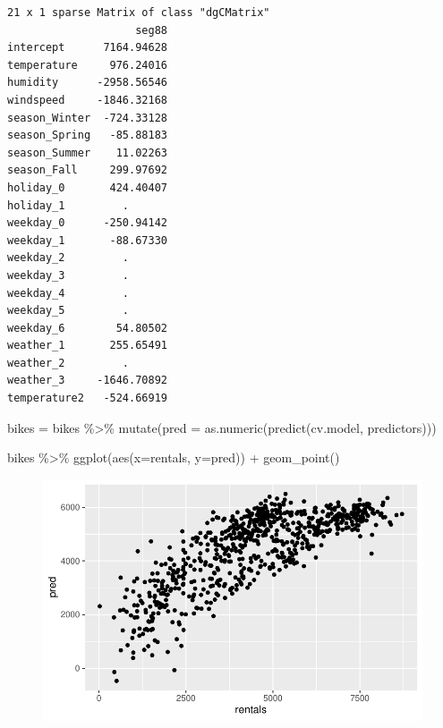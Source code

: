 \documentclass[
  letterpaper,
  DIV=11,
  numbers=noendperiod]{scrartcl}
\newenvironment{Shaded}{\begin{snugshade}}{\end{snugshade}}
\newcommand{\AttributeTok}[1]{\textcolor[rgb]{0.40,0.45,0.13}{#1}}
\newcommand{\FunctionTok}[1]{\textcolor[rgb]{0.28,0.35,0.67}{#1}}
\newcommand{\NormalTok}[1]{\textcolor[rgb]{0.00,0.23,0.31}{#1}}
\newcommand{\OtherTok}[1]{\textcolor[rgb]{0.00,0.23,0.31}{#1}}
\newcommand{\SpecialCharTok}[1]{\textcolor[rgb]{0.37,0.37,0.37}{#1}}
\begin{document}
\begin{verbatim}
21 x 1 sparse Matrix of class "dgCMatrix"
                    seg88
intercept      7164.94628
temperature     976.24016
humidity      -2958.56546
windspeed     -1846.32168
season_Winter  -724.33128
season_Spring   -85.88183
season_Summer    11.02263
season_Fall     299.97692
holiday_0       424.40407
holiday_1         .      
weekday_0      -250.94142
weekday_1       -88.67330
weekday_2         .      
weekday_3         .      
weekday_4         .      
weekday_5         .      
weekday_6        54.80502
weather_1       255.65491
weather_2         .      
weather_3     -1646.70892
temperature2   -524.66919
\end{verbatim}

\begin{Shaded}
\begin{Highlighting}[]
\NormalTok{bikes }\OtherTok{=}\NormalTok{ bikes }\SpecialCharTok{\%\textgreater{}\%}
  \FunctionTok{mutate}\NormalTok{(}\AttributeTok{pred =} \FunctionTok{as.numeric}\NormalTok{(}\FunctionTok{predict}\NormalTok{(cv.model, predictors)))}
\end{Highlighting}
\end{Shaded}

\begin{Shaded}
\begin{Highlighting}[]
\NormalTok{bikes }\SpecialCharTok{\%\textgreater{}\%}
  \FunctionTok{ggplot}\NormalTok{(}\FunctionTok{aes}\NormalTok{(}\AttributeTok{x=}\NormalTok{rentals, }\AttributeTok{y=}\NormalTok{pred)) }\SpecialCharTok{+}
  \FunctionTok{geom\_point}\NormalTok{()}
\end{Highlighting}
\end{Shaded}

\begin{figure}[H]

{\centering \includegraphics{index_files/figure-pdf/unnamed-chunk-23-1.pdf}

}

\end{figure}
\end{document}
